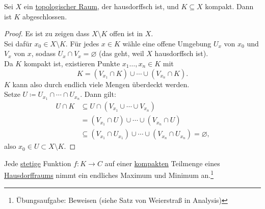 \begin{lemma}
  Sei $ X $ ein \hyperref[def:topologie]{topologischer Raum}, der hausdorffsch ist, und $ K \subseteq X $ kompakt. Dann ist $ K $ abgeschlossen.
  \begin{proof}
    Es ist zu zeigen dass $ X \setminus K $ offen ist in $ X $. \\
    Sei dafür $ x_0 \in X \setminus K $. Für jedes $ x \in K $ wähle eine offene Umgebung $ U_x $ von $ x_0 $ und $ V_x $ von $ x $, sodass $ U_x \cap V_x = \varnothing $ (das geht, weil $ X $ hausdorffsch ist). \\
    Da $ K $ kompakt ist, existieren Punkte $ x_1 \dots, x_n \in K $ mit
    \begin{equation*}
      K = (V_{x_1} \cap K) \cup \cdots \cup (V_{x_n} \cap K)\text{.}
    \end{equation*}
    $ K $ kann also durch endlich viele Mengen überdeckt werden. \\
    Setze $ U \coloneqq U_{x_1} \cap \cdots \cap U_{x_n} $. Dann gilt:
    \begin{align*}
      U \cap K &\subseteq U \cap (V_{x_1} \cup \cdots \cup V_{x_n}) \\
       &= (V_{x_1} \cap U) \cup \cdots \cup (V_{x_n} \cap U) \\
       &\subseteq (V_{x_1} \cap U_{x_1}) \cup \cdots \cup (V_{x_n} \cap U_{x_n}) = \varnothing\text{,}
    \end{align*}
    also $ x_0 \in U \subset X \setminus K $.
  \end{proof}
\end{lemma}

\begin{corollary}
  Jede \hyperref[def:stetig]{stetige} Funktion $ f : K \to C $ auf einer \hyperref[def:kompakt]{kompakten} Teilmenge eines \hyperref[def:hausdorffsch]{Hausdorffraums} nimmt ein endliches Maximum und Minimum an.\footnote{Übungsaufgabe: Beweisen (siehe Satz von Weierstraß in Analysis)}
\end{corollary}


